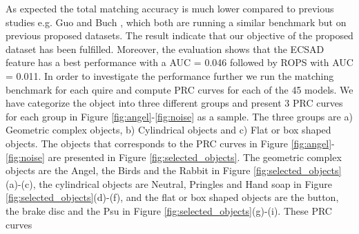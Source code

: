\documentclass[10pt,twocolumn,letterpaper]{article}
\begin{document}
As expected the total matching accuracy is much lower compared to previous studies e.g. Guo \etal \cite{Guo2015} and Buch \etal \cite{Buch2016}, which both are running a similar benchmark but on previous proposed datasets. The result indicate that our objective of the proposed dataset has been fulfilled. Moreover, the evaluation shows that the ECSAD feature has a best performance with a AUC = 0.046 followed by ROPS with AUC = 0.011. In order to investigate the performance further we run the matching benchmark for each quire and compute PRC curves for each of the 45 models. We have categorize the object into three different groups and present 3 PRC curves for each group in Figure \ref{fig:angel}-\ref{fig:noise} as a sample. The three groups are a) Geometric complex objects, b) Cylindrical objects and c) Flat or box shaped objects. The objects that corresponds to the PRC curves in Figure \ref{fig:angel}-\ref{fig:noise} are presented in Figure \ref{fig:selected_objects}. The geometric complex objects are the Angel, the Birds and the Rabbit in Figure \ref{fig:selected_objects}(a)-(c), the cylindrical objects are Neutral, Pringles and Hand soap in Figure \ref{fig:selected_objects}(d)-(f), and the flat or box shaped objects are the button, the brake disc and the Psu in Figure \ref{fig:selected_objects}(g)-(i). These PRC curves  	


\end{document}
